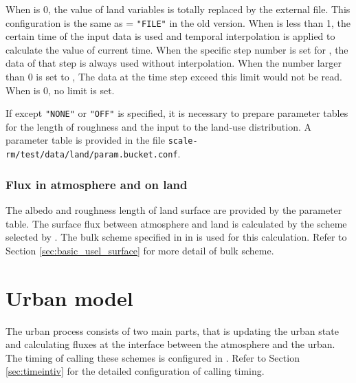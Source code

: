 When  is 0, the value of land variables is totally replaced by the external file. This configuration is the same as  = \verb|"FILE"| in the old version.
%
When  is less than 1, the certain time of the input data is used and temporal interpolation is applied to calculate the value of current time. When the specific step number is set for , the data of that step is always used without interpolation.
%
When the number larger than 0 is set to , The data at the time step exceed this limit would not be read. When  is 0, no limit is set.

If  except \verb|"NONE"| or \verb|"OFF"| is specified,
it is necessary to prepare parameter tables for the length of roughness and the input to the land-use distribution.
A parameter table is provided
in the file \verb|scale-rm/test/data/land/param.bucket.conf|.\\

\subsubsection{Flux in atmosphere and on land}
The albedo and roughness length of land surface are provided by the parameter table. The surface flux between atmosphere and land is calculated by the scheme selected by . The bulk scheme specified in  in  is used for this calculation. Refer to Section \ref{sec:basic_usel_surface} for more detail of bulk scheme.



\section{Urban model} \label{sec:basic_usel_urban}
The urban process consists of two main parts, that is updating the urban state and calculating fluxes at the interface between the atmosphere and the urban.
The timing of calling these schemes is configured in . Refer to Section \ref{sec:timeintiv} for the detailed configuration of calling timing.

